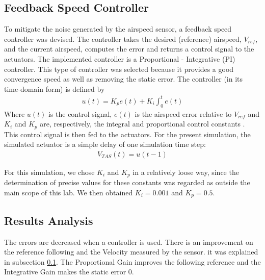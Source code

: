 \documentclass{article}
\begin{document}
\subsection{Feedback Speed Controller} \label{sec:fsc}

To mitigate the noise generated by the airspeed sensor, a feedback speed controller was devised. The controller takes the desired (reference) airspeed, $V_{ref}$, and the current airspeed, computes the error and returns a control signal to the actuators. The implemented controller is a Proportional - Integrative (PI) controller. This type of controller was selected because it provides a good convergence speed as well as removing the static error. The controller (in its time-domain form) is defined by
\begin{gather*}
    u(t)=K_pe(t)+K_i\int_0^t e(t)
\end{gather*}
Where $u(t)$ is the control signal, $e(t)$ is the airspeed error relative to $V_{ref}$ and $K_i$ and $K_p$ are, respectively, the integral and proportional control constants . This control signal is then fed to the actuators. For the present simulation, the simulated actuator is a simple delay of one simulation time step:
\begin{gather*}
    V_{TAS}(t)=u(t-1)
\end{gather*}

For this simulation, we chose $K_i$ and $K_p$ in a relatively loose way, since the determination of precise values for these constants was regarded as outside the main scope of this lab. We then obtained $K_i=0.001$ and $K_p=0.5$.

\subsection{Results Analysis}
The errors are decreased when a controller is used. There is an improvement on the reference following and the Velocity measured by the sensor. it was explained in subsection \ref{sec:fsc}. The Proportional Gain improves the following reference and the Integrative Gain makes the static error 0.
\end{document}
